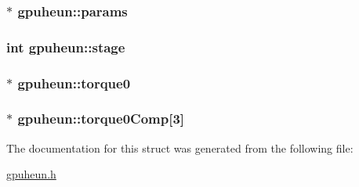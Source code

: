 \label{structgpuheun_aeee03bc1018dae008c269f1ada8185e6}
\hypertarget{structgpuheun_a83f1420f61c8d996ca9b5b628eb1f529}{
\subsubsection[{params}]{$\ast$ {\bf gpuheun::params}}}
\label{structgpuheun_a83f1420f61c8d996ca9b5b628eb1f529}
\hypertarget{structgpuheun_a88a5d914ef7c1d8861517729d37c942a}{
\subsubsection[{stage}]{\setlength{\rightskip}{0pt plus 5cm}int {\bf gpuheun::stage}}}
\label{structgpuheun_a88a5d914ef7c1d8861517729d37c942a}
\hypertarget{structgpuheun_a246cba047c614e3d478f9bb901b26138}{
\subsubsection[{torque0}]{$\ast$ {\bf gpuheun::torque0}}}
\label{structgpuheun_a246cba047c614e3d478f9bb901b26138}
\hypertarget{structgpuheun_a2da07934eedc37af28503ccbf3401d3b}{
\subsubsection[{torque0Comp}]{$\ast$ {\bf gpuheun::torque0Comp}\mbox{[}3\mbox{]}}}
\label{structgpuheun_a2da07934eedc37af28503ccbf3401d3b}


The documentation for this struct was generated from the following file:\begin{DoxyCompactItemize}
\item 
\hyperlink{gpuheun_8h}{gpuheun.h}\end{DoxyCompactItemize}
